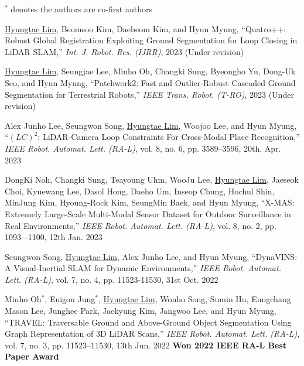 
\begin{cvparagraph}
    $^*$ denotes the authors are co-first authors
\end{cvparagraph}




\newcommand{\hyungtaelim}{\underline{Hyungtae Lim}}

\begin{pubSubsectionNum}
    \item {\hyungtaelim, Beomsoo Kim, Daebeom Kim, and Hyun Myung, ``Quatro++: Robust Global Registration Exploiting Ground Segmentation for Loop Closing in LiDAR SLAM,'' \textit{Int. J. Robot. Res. (IJRR)}, 2023 (Under revision)}
    \item {\hyungtaelim, Seungjae Lee, Minho Oh, Changki Sung, Byeongho Yu, Dong-Uk Seo, and Hyun Myung, ``Patchwork2: Fast and Outlier-Robust Cascaded Ground Segmentation for Terrestrial Robots,'' \textit{IEEE Trans. Robot. (T-RO)}, 2023 (Under revision)}
    \item Alex Junho Lee, Seungwon Song, \hyungtaelim, Woojoo Lee, and Hyun Myung, ``$(LC)^2$: LiDAR-Camera Loop Constraints For Cross-Modal Place Recognition,'' \textit{IEEE Robot. Automat. Lett. (RA-L)}, vol. 8, no. 6, pp. 3589--3596, 20th, Apr. 2023
    \item DongKi Noh, Changki Sung, Teayoung Uhm, WooJu Lee, \hyungtaelim, Jaeseok Choi, Kyuewang Lee, Dasol Hong, Daeho Um, Inseop Chung, Hochul Shin, MinJung Kim, Hyoung-Rock Kim, SeungMin Baek, and Hyun Myung, ``X-MAS: Extremely Large-Scale Multi-Modal Sensor Dataset for Outdoor Surveillance in Real Environments,'' \textit{IEEE Robot. Automat. Lett. (RA-L)}, vol. 8, no. 2, pp. 1093–-1100, 12th Jan. 2023
    \item Seungwon Song, \hyungtaelim, Alex Junho Lee, and Hyun Myung, ``DynaVINS: A Visual-Inertial SLAM for Dynamic Environments,'' \textit{IEEE Robot. Automat. Lett. (RA-L)}, vol. 7, no. 4, pp. 11523-11530, 31st Oct. 2022
    \item Minho Oh$^*$, Euigon Jung$^*$, \hyungtaelim, Wonho Song, Sumin Hu, Eungchang Mason Lee, Junghee Park, Jaekyung Kim, Jangwoo Lee, and Hyun Myung, ``TRAVEL: Traversable Ground and Above-Ground Object Segmentation Using Graph Representation of 3D LiDAR Scans,'' \textit{IEEE Robot. Automat. Lett. (RA-L)}, vol. 7, no. 3, pp. 11523--11530, 13th Jun. 2022 \textbf{Won 2022 IEEE RA-L Best Paper Award}

\end{pubSubsectionNum}
